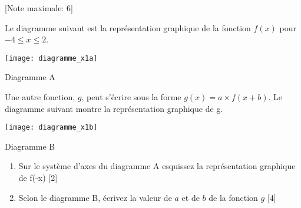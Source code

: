 \begin{question}
  \hspace*{\fill} [Note maximale: 6]\par
  \medskip
  \begin{center} %
    \noindent Le diagramme suivant est la représentation graphique de la fonction $f(x)$ pour $ -4 \le x \le 2$.\par
    \texttt{[image: diagramme\_x1a]}\par
    \noindent Diagramme A\par
  \end{center} %
  \medskip
  \begin{center} %
    \noindent Une autre fonction, $g$, peut s’écrire sous la forme $g(x) = a \times f(x + b)$. Le diagramme suivant
montre la représentation graphique de g.\par
    \texttt{[image: diagramme\_x1b]}\par
    \noindent Diagramme B\par
  \end{center} %
  \medskip
  \begin{enumerate}[label=(\alph*)]
    \item Sur le système d'axes du diagramme A esquissez la représentation graphique de f(-x)\hspace*{\fill} [2]
    \item Selon le diagramme B, écrivez la valeur de $a$ et de $b$ de la fonction $g$ \hspace*{\fill} [4]
  \end{enumerate}
\end{question}
